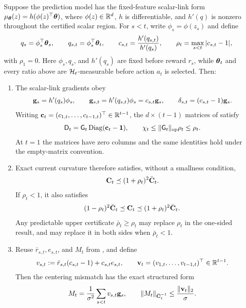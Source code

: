\begin{lemma}
\label{lem:relative-link-drift}
Suppose the prediction model has the fixed-feature scalar-link form
$\mu_{\boldsymbol{\theta}}(z)=h(\phi(z)^\top\boldsymbol{\theta})$, where
$\phi(z)\in\mathbb{R}^d$, $h$ is differentiable, and $h'(q)$ is nonzero throughout
the certified scalar region.  For $s<t$, write $\phi_s=\phi(z_s)$ and define
\[
 q_s=\phi_s^\top\boldsymbol{\theta}_s,\qquad
 q_{s,t}=\phi_s^\top\boldsymbol{\theta}_t,\qquad
 c_{s,t}=\frac{h'(q_{s,t})}{h'(q_s)},\qquad
 \rho_t=\max_{s<t}|c_{s,t}-1|,
\]
with $\rho_1=0$.  Here $\phi_s,q_s$, and $h'(q_s)$ are fixed before reward
$r_s$, while $\boldsymbol{\theta}_t$ and every ratio above are $\mathcal{H}_t$-measurable
before action $a_t$ is selected.  Then:
\begin{enumerate}[nosep,label=(\alph*),leftmargin=1.6em]
\item The scalar-link gradients obey
\begin{equation}\label{eq:relative-link-gradients}
 \mathbf{g}_s=h'(q_s)\phi_s,\qquad
 \mathbf{g}_{s,t}=h'(q_{s,t})\phi_s=c_{s,t}\mathbf{g}_s,\qquad
 \delta_{s,t}=(c_{s,t}-1)\mathbf{g}_s.
\end{equation}
Writing $\mathbf c_t=(c_{1,t},\ldots,c_{t-1,t})^\top\in\mathbb{R}^{t-1}$, the
$d\times(t-1)$ matrices of  satisfy
\begin{equation}\label{eq:relative-link-D}
 \mathsf{D}_t=\mathsf{G}_t\operatorname{Diag}(\mathbf c_t-\mathbf{1}),\qquad
 \chi_t\le\|\mathsf{G}_t\|_{\rm op}\rho_t\le\rho_t.
\end{equation}
At $t=1$ the matrices have zero columns and the same identities hold under the
empty-matrix convention.

\item Exact current curvature therefore satisfies, without a smallness
condition,
\begin{equation}\label{eq:relative-link-transfer}
 \mathbf{C}_t\preceq(1+\rho_t)^2\bar{\mathbf{C}}_t.
\end{equation}
If $\rho_t<1$, it also satisfies
\begin{equation}\label{eq:relative-link-sandwich}
 (1-\rho_t)^2\bar{\mathbf{C}}_t\preceq\mathbf{C}_t
 \preceq(1+\rho_t)^2\bar{\mathbf{C}}_t.
\end{equation}
Any predictable upper certificate $\bar\rho_t\ge\rho_t$ may replace $\rho_t$
in the one-sided result, and may replace it in both sides when
$\bar\rho_t<1$.

\item Reuse $\bar r_{s,t},e_{s,t}$, and $M_t$ from
, and define
\begin{equation}\label{eq:relative-link-v}
 v_{s,t}:=\bar r_{s,t}(c_{s,t}-1)+c_{s,t}e_{s,t},\qquad
 \mathbf{v}_t=(v_{1,t},\ldots,v_{t-1,t})^\top\in\mathbb{R}^{t-1}.
\end{equation}
Then the centering mismatch has the exact structured form
\begin{equation}\label{eq:relative-link-M}
 M_t=\frac1{\sigma^2}\sum_{s<t}v_{s,t}\mathbf{g}_s,\qquad
 \|M_t\|_{\bar{\mathbf{C}}_t^{-1}}\le\frac{\|\mathbf{v}_t\|_2}{\sigma}.
\end{equation}


\end{enumerate}
\end{lemma}
